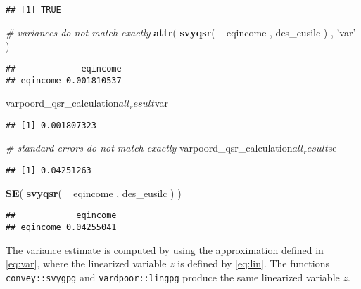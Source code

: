 \documentclass[]{book}
\newenvironment{Shaded}{\begin{snugshade}}{\end{snugshade}}
\newcommand{\KeywordTok}[1]{\textcolor[rgb]{0.13,0.29,0.53}{\textbf{{#1}}}}
\newcommand{\StringTok}[1]{\textcolor[rgb]{0.31,0.60,0.02}{{#1}}}
\newcommand{\CommentTok}[1]{\textcolor[rgb]{0.56,0.35,0.01}{\textit{{#1}}}}
\newcommand{\NormalTok}[1]{{#1}}
\theoremstyle{definition}
\theoremstyle{definition}
\theoremstyle{remark}
\begin{document}
\begin{verbatim}
## [1] TRUE
\end{verbatim}

\begin{Shaded}
\begin{Highlighting}[]
\CommentTok{# variances do not match exactly}
\KeywordTok{attr}\NormalTok{( }\KeywordTok{svyqsr}\NormalTok{( ~}\StringTok{ }\NormalTok{eqincome , des_eusilc ) , }\StringTok{'var'} \NormalTok{)}
\end{Highlighting}
\end{Shaded}

\begin{verbatim}
##             eqincome
## eqincome 0.001810537
\end{verbatim}

\begin{Shaded}
\begin{Highlighting}[]
\NormalTok{varpoord_qsr_calculation$all_result$var}
\end{Highlighting}
\end{Shaded}

\begin{verbatim}
## [1] 0.001807323
\end{verbatim}

\begin{Shaded}
\begin{Highlighting}[]
\CommentTok{# standard errors do not match exactly}
\NormalTok{varpoord_qsr_calculation$all_result$se}
\end{Highlighting}
\end{Shaded}

\begin{verbatim}
## [1] 0.04251263
\end{verbatim}

\begin{Shaded}
\begin{Highlighting}[]
\KeywordTok{SE}\NormalTok{( }\KeywordTok{svyqsr}\NormalTok{( ~}\StringTok{ }\NormalTok{eqincome , des_eusilc ) )}
\end{Highlighting}
\end{Shaded}

\begin{verbatim}
##            eqincome
## eqincome 0.04255041
\end{verbatim}

The variance estimate is computed by using the approximation defined in
\eqref{eq:var}, where the linearized variable \(z\) is defined by
\eqref{eq:lin}. The functions \texttt{convey::svygpg} and
\texttt{vardpoor::lingpg} produce the same linearized variable \(z\).
\end{document}
